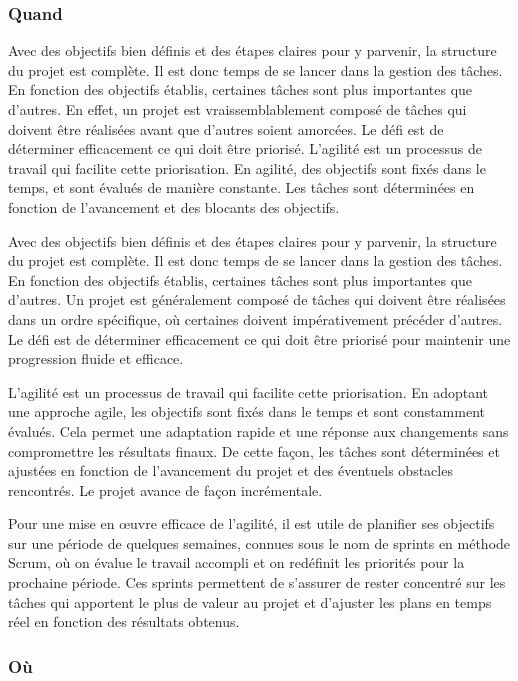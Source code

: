 \documentclass[
  letterpaper,
  DIV=11,
  numbers=noendperiod]{scrreprt}
\begin{document}
\subsubsection{Quand}\label{quand}

Avec des objectifs bien définis et des étapes claires pour y parvenir,
la structure du projet est complète. Il est donc temps de se lancer dans
la gestion des tâches. En fonction des objectifs établis, certaines
tâches sont plus importantes que d'autres. En effet, un projet est
vraissemblablement composé de tâches qui doivent être réalisées avant
que d'autres soient amorcées. Le défi est de déterminer efficacement ce
qui doit être priorisé. L'agilité est un processus de travail qui
facilite cette priorisation. En agilité, des objectifs sont fixés dans
le temps, et sont évalués de manière constante. Les tâches sont
déterminées en fonction de l'avancement et des blocants des objectifs.

Avec des objectifs bien définis et des étapes claires pour y parvenir,
la structure du projet est complète. Il est donc temps de se lancer dans
la gestion des tâches. En fonction des objectifs établis, certaines
tâches sont plus importantes que d'autres. Un projet est généralement
composé de tâches qui doivent être réalisées dans un ordre spécifique,
où certaines doivent impérativement précéder d'autres. Le défi est de
déterminer efficacement ce qui doit être priorisé pour maintenir une
progression fluide et efficace.

L'agilité est un processus de travail qui facilite cette priorisation.
En adoptant une approche agile, les objectifs sont fixés dans le temps
et sont constamment évalués. Cela permet une adaptation rapide et une
réponse aux changements sans compromettre les résultats finaux. De cette
façon, les tâches sont déterminées et ajustées en fonction de
l'avancement du projet et des éventuels obstacles rencontrés. Le projet
avance de façon incrémentale.

Pour une mise en œuvre efficace de l'agilité, il est utile de planifier
ses objectifs sur une période de quelques semaines, connues sous le nom
de sprints en méthode Scrum, où on évalue le travail accompli et on
redéfinit les priorités pour la prochaine période. Ces sprints
permettent de s'assurer de rester concentré sur les tâches qui apportent
le plus de valeur au projet et d'ajuster les plans en temps réel en
fonction des résultats obtenus.

\subsubsection{Où}\label{ouxf9}
\end{document}
